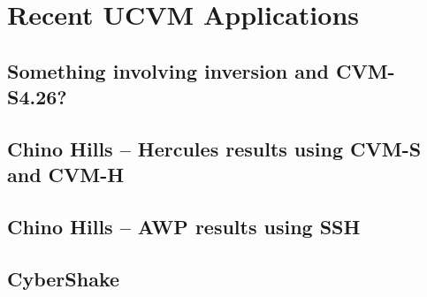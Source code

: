 
\section{Recent UCVM Applications}
\subsection{Something involving inversion and CVM-S4.26?}
\subsection{Chino Hills -- Hercules results using CVM-S and CVM-H}
\subsection{Chino Hills -- AWP results using SSH}
\subsection{CyberShake}